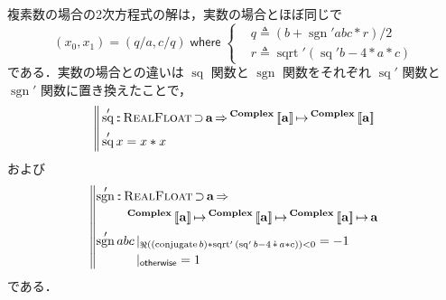 \documentclass[a5paper,twoside,fleqn,draft]{jsbook}
\def\[{\left[\!\left[}
\def\]{\right]\!\right]}
\DeclareMathOperator{\sgn}{sgn}
\newcommand{\mBrace}{\Vert}
\newcommand{\mKeyword}[1]{\mathsf{#1}} %
\newcommand{\mOtherwiseKeyword}{\mKeyword{otherwise}}
\newcommand{\mWhereKeyword}{\mKeyword{where}}
\DeclareMathOperator{\mOtherwise}{\mOtherwiseKeyword}
\DeclareMathOperator{\mSuperClass}{\Rightarrow}
\DeclareMathOperator{\mSuperSet}{\supset}
\DeclareMathOperator{\mWhere}{\mWhereKeyword}
\newcommand{\mSpecialFunc}[1]{\mathrm{#1}}
\DeclareMathOperator{\mConjugate}{\mSpecialFunc{conjugate}}
\DeclareMathOperator{\mRealPart}{\Re}
\DeclareMathOperator{\mSq}{\mSpecialFunc{sq}}
\DeclareMathOperator{\mSqrt}{\mSpecialFunc{sqrt}}
\DeclareMathOperator{\mComplexTimes}{\Dot\ast}
\DeclareMathOperator{\mIn}{{:\!:}}
\DeclareMathOperator{\mLetEq}{\triangleq}
\DeclareMathOperator{\mMapsTo}{\mapsto}
\newcommand{\mType}[1]{\mathbf{#1}}
\newcommand{\mGenericTypeAssemble}[2]{{}^{\mType{#1}}\[\mType{#2}\]}
\newcommand{\mComplexType}[1]{\mGenericTypeAssemble{Complex}{#1}}
\newcommand{\mGenericTypeClass}[1]{\textsc{#1}} %
\newcommand{\mRealFloatTypeClass}{\mGenericTypeClass{RealFloat}}
\newcommand{\mGuard}[1]{\mathop{\mid_{#1}}}
\newcommand{\mProj}[2]{#1\mMapsTo#2}
\begin{document}
複素数の場合の2次方程式の解は，実数の場合とほぼ同じで
\begin{equation}
  (x_0,x_1)=(q/a,c/q)\mWhere\left\{
  \begin{aligned}
    &q\mLetEq\left(b+\sgn'abc*r\right)/2\\
    &r\mLetEq\mSqrt'{(\mSq'b-4*a*c)}
  \end{aligned}
  \right.
\end{equation}
である．実数の場合との違いは $\mSq$ 関数と $\sgn$ 関数をそれぞれ
$\mSq'$ 関数と $\sgn'$ 関数に置き換えたことで，
\begin{equation}
  \left\mBrace
  \begin{aligned}
    &\mSq'\mIn\mRealFloatTypeClass\mSuperSet\mType{a}\mSuperClass\mProj{\mComplexType{a}}{\mComplexType{a}}\\
    &\mSq'x=x*x
  \end{aligned}
  \right.
\end{equation}
および
\begin{equation}
  \left\mBrace
  \begin{aligned}
    &\begin{aligned}
       \sgn'&\mIn\mRealFloatTypeClass\mSuperSet\mType{a}\mSuperClass\\
       &\quad\mProj{\mComplexType{a}}{\mProj{\mComplexType{a}}{\mProj{\mComplexType{a}}{\mType{a}}}}
     \end{aligned}\\
    &\begin{aligned}
       \sgn'abc&\mGuard{\mRealPart((\mConjugate b)*\mSqrt'{(\mSq' b-4\mComplexTimes a*c)})<0}=-1\\
       &\mGuard{\mOtherwise}=1
     \end{aligned}
  \end{aligned}
  \right.
\end{equation}
である．
\end{document}
